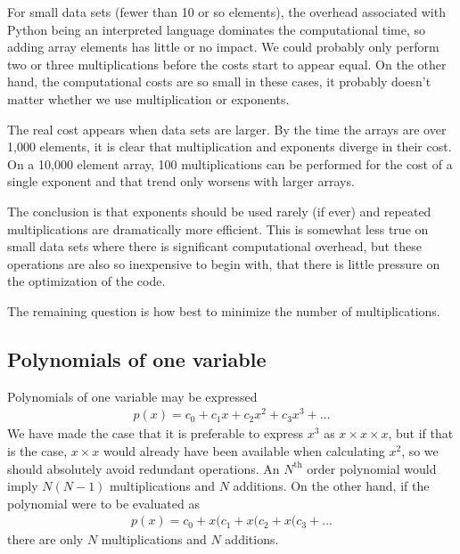 \documentclass[letterpaper,11pt]{article}
\begin{document}
For small data sets (fewer than 10 or so elements), the overhead associated with Python being an interpreted language dominates the computational time, so adding array elements has little or no impact.  We could probably only perform two or three multiplications before the costs start to appear equal.  On the other hand, the computational costs are so small in these cases, it probably doesn't matter whether we use multiplication or exponents.

The real cost appears when data sets are larger.  By the time the arrays are over 1,000 elements, it is clear that multiplication and exponents diverge in their cost.  On a 10,000 element array, 100 multiplications can be performed for the cost of a single exponent and that trend only worsens with larger arrays.

The conclusion is that exponents should be used rarely (if ever) and repeated multiplications are dramatically more efficient.  This is somewhat less true on small data sets where there is significant computational overhead, but these operations are also so inexpensive to begin with, that there is little pressure on the optimization of the code.

The remaining question is how best to minimize the number of multiplications.

\subsection{Polynomials of one variable}

Polynomials of one variable may be expressed
\begin{align}
p(x) = c_0 + c_1 x + c_2 x^2 + c_3 x^3 + \ldots
\end{align}
We have made the case that it is preferable to express $x^3$ as $x\times x\times x$, but if that is the case, $x \times x$ would already have been available when calculating $x^2$, so we should absolutely avoid redundant operations.  An $N^\mathrm{th}$ order polynomial would imply $N(N-1)$ multiplications and $N$ additions.  On the other hand, if the polynomial were to be evaluated as
\begin{align}
p(x) = c_0 + x(c_1 + x(c_2 + x(c_3 + \ldots
\end{align}
there are only $N$ multiplications and $N$ additions.
\end{document}
